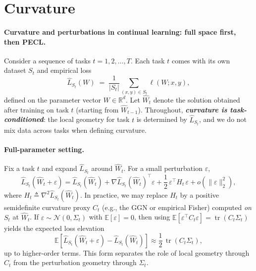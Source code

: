 \documentclass{article}
\theoremstyle{plain}
\theoremstyle{definition}
\theoremstyle{remark}
\begin{document}
\printAffiliationsAndNotice{\icmlEqualContribution} %

 \clearpage      %
\onecolumn      %
\section{Curvature}
\paragraph{Curvature and perturbations in continual learning: full space first, then PECL.}
Consider a sequence of tasks $t=1,2,\dots,T$. Each task $t$ comes with its own dataset $S_t$ and empirical loss
$$
\hat L_{S_t}(W)\;=\;\frac{1}{|S_t|}\sum_{(x,y)\in S_t}\ell(W;x,y),
$$
defined on the parameter vector $W\in\mathbb R^d$. Let $\hat W_t$ denote the solution obtained after training on task $t$ (starting from $\hat W_{t-1}$). Throughout, \textbf{\emph{curvature is task-conditioned}}: the local geometry for task $t$ is determined by $\hat L_{S_t}$, and we do not mix data across tasks when defining curvature.

\paragraph{Full-parameter setting.}
Fix a task $t$ and expand $\hat L_{S_t}$ around $\hat W_t$. For a small perturbation $\varepsilon$,
$$
\hat L_{S_t}(\hat W_t+\varepsilon)
=
\hat L_{S_t}(\hat W_t)
+
\nabla \hat L_{S_t}(\hat W_t)^\top \varepsilon
+
\frac12\,\varepsilon^\top H_t\,\varepsilon
+
o(\|\varepsilon\|_2^2),
$$
where $H_t\triangleq\nabla^2 \hat L_{S_t}(\hat W_t)$. In practice, we may replace $H_t$ by a positive semidefinite curvature proxy $C_t$ (e.g., the GGN or empirical Fisher) computed \emph{on $S_t$} at $\hat W_t$. If $\varepsilon\sim\mathcal N(0,\Sigma_t)$ with $\mathbb E[\varepsilon]=0$, then using $\mathbb E[\varepsilon^\top C_t\varepsilon]=\operatorname{tr}(C_t\Sigma_t)$ yields the expected loss elevation
$$
\mathbb E\!\left[\hat L_{S_t}(\hat W_t+\varepsilon)-\hat L_{S_t}(\hat W_t)\right]
\approx
\frac12\,\operatorname{tr}(C_t\Sigma_t),
$$
up to higher-order terms. This form separates the role of local geometry through $C_t$ from the perturbation geometry through $\Sigma_t$.
\end{document}
